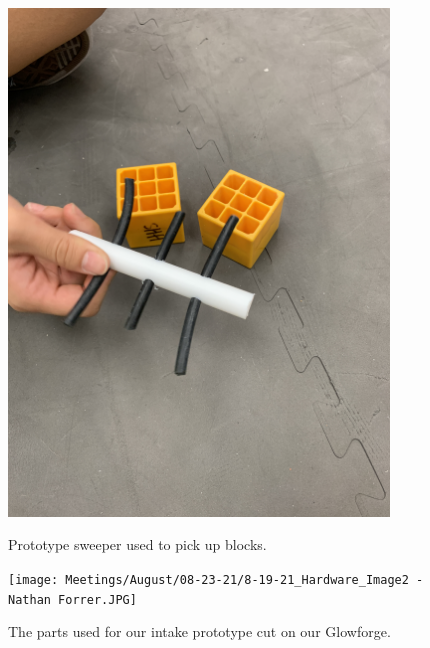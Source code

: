 \begin{figure}[ht]
\centering
\begin{minipage}[b]{.50\textwidth}
  \centering
  \includegraphics[width=0.9\textwidth, angle=0]{Meetings/August/08-23-21/8-19-21_Hardware_Image1 - Nathan Forrer.JPG}
  \caption{Prototype sweeper used to pick up blocks.}
  \label{fig:pic1}
\end{minipage}%
\hfill%
\begin{minipage}[b]{.50\textwidth}
  \centering
  \texttt{[image: Meetings/August/08-23-21/8-19-21\_Hardware\_Image2 - Nathan Forrer.JPG]}
  \caption{The parts used for our intake prototype cut on our Glowforge.}
  \label{fig:pic2}
\end{minipage}
\end{figure}